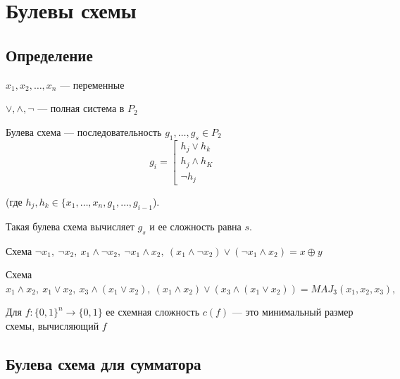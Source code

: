 \section{Булевы схемы}

\subsection{Определение}

\begin{defn}{}{}
    \( x_1, x_2, \ldots, x_n \) --- переменные

    \( \lor, \land, \lnot \) --- полная система в \( P_2 \)

    Булева схема --- последовательность \( g_1, \ldots, g_s \in P_2 \)
    \[
        g_i = \left[
            \begin{aligned}
                h_j \lor h_k
                \\
                h_j \land h_K
                \\
                \lnot h_j
            \end{aligned}
        \right.
    \]

    (где \( h_j, h_k \in \{ x_1, \ldots, x_n, g_1, \ldots, g_{i - 1} \)).

    Такая булева схема вычисляет \( g_s \) и ее сложность равна \( s \).
\end{defn}

\begin{example}{}{}
    Схема
    \(
        \lnot x_1, \:
        \lnot x_2, \:
        x_1 \land \lnot x_2, \:
        \lnot x_1 \land x_2, \:
        (x_1 \land \lnot x_2) \lor (\lnot x_1 \land x_2) = x \oplus y
    \)
\end{example}

\begin{example}{}{}
    Схема
    \(
        x_1 \land x_2, \:
        x_1 \lor x_2, \:
        x_3 \land (x_1 \lor x_2), \:
        (x_1 \land x_2) \lor (x_3 \land (x_1 \lor x_2)) = MAJ_3(x_1, x_2, x_3), \:
    \)
\end{example}

\begin{defn}{}{}
    Для \( f : \{ 0, 1 \}^n \to \{ 0, 1 \} \) ее схемная сложность \( c(f) \)
    --- это минимальный размер схемы, вычисляющий \( f \)
\end{defn}

\subsection{Булева схема для сумматора}


